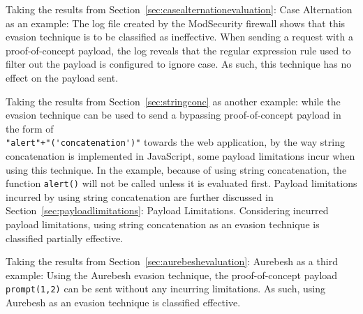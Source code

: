 Taking the results from Section~\ref{sec:casealternationevaluation}: Case Alternation as an example: The log file created by the ModSecurity firewall shows that this evasion technique is to be classified as ineffective. When sending a request with a proof-of-concept payload, the log reveals that the regular expression rule used to filter out the payload is configured to ignore case. As such, this technique has no effect on the payload sent.

Taking the results from Section~\ref{sec:stringconc} as another example: while the evasion technique can be used to send a bypassing proof-of-concept payload in the form of \\ \verb|"alert"+"('concatenation')"| towards the web application, by the way string concatenation is implemented in JavaScript, some payload limitations incur when using this technique. In the example, because of using string concatenation, the function \verb|alert()| will not be called unless it is evaluated first. Payload limitations incurred by using string concatenation are further discussed in Section~\ref{sec:payloadlimitations}: Payload Limitations. Considering incurred payload limitations, using string concatenation as an evasion technique is classified partially effective.

Taking the results from Section~\ref{sec:aurebeshevaluation}: Aurebesh as a third example: Using the Aurebesh evasion technique, the proof-of-concept payload \verb|prompt(1,2)| can be sent without any incurring limitations. As such, using Aurebesh as an evasion technique is classified effective.

